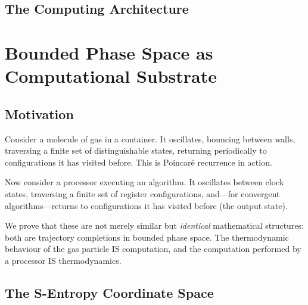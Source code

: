
\subsection{The Computing Architecture}
\label{part:architecture}

\section{Bounded Phase Space as Computational Substrate}
\label{sec:substrate}

\subsection{Motivation}

Consider a molecule of gas in a container. It oscillates, bouncing between walls, traversing a finite set of distinguishable states, returning periodically to configurations it has visited before. This is Poincar\'{e} recurrence in action.

Now consider a processor executing an algorithm. It oscillates between clock states, traversing a finite set of register configurations, and---for convergent algorithms---returns to configurations it has visited before (the output state).

We prove that these are not merely similar but \emph{identical} mathematical structures: both are trajectory completions in bounded phase space. The thermodynamic behaviour of the gas particle IS computation, and the computation performed by a processor IS thermodynamics.

\subsection{The S-Entropy Coordinate Space}


